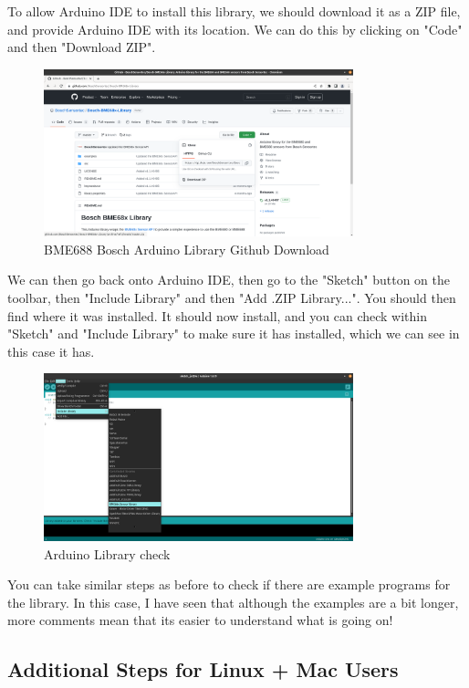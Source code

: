 \documentclass[a4paper,11pt]{report}
\begin{document}
To allow Arduino IDE to install this library, we should download it as a ZIP file, and provide Arduino IDE with its location. We can do this by clicking on "Code" and then "Download ZIP".

\begin{figure}[H]
\centering
\includegraphics[width=0.8\textwidth]{screenshots/boscharduinolibrarygithubdownload}
\caption{BME688 Bosch Arduino Library Github Download}
\end{figure}

We can then go back onto Arduino IDE, then go to the "Sketch" button on the toolbar, then "Include Library" and then "Add .ZIP Library...". You should then find where it was installed. It should now install, and you can check within "Sketch" and "Include Library" to make sure it has installed, which we can see in this case it has.

\begin{figure}[H]
\centering
\includegraphics[width=0.8\textwidth]{screenshots/arduinolibraryinstallcheck}
\caption{Arduino Library check}
\end{figure}

You can take similar steps as before to check if there are example programs for the library. In this case, I have seen that although the examples are a bit longer, more comments mean that its easier to understand what is going on!

\subsection{Additional Steps for Linux + Mac Users}
\end{document}
